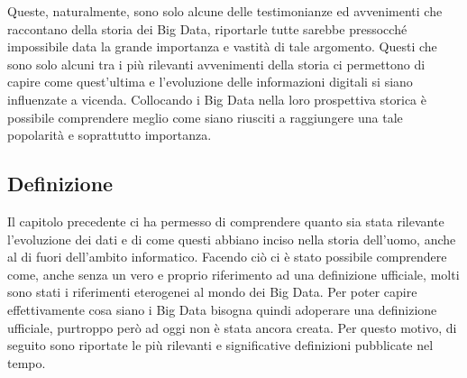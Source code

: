 Queste, naturalmente, sono solo alcune delle testimonianze ed avvenimenti che raccontano della storia dei Big Data, riportarle tutte sarebbe pressocché impossibile data la grande importanza e vastità di tale argomento. Questi che sono solo alcuni tra i più rilevanti avvenimenti della storia ci permettono di capire come quest’ultima e l’evoluzione delle informazioni digitali si siano influenzate a vicenda. Collocando i Big Data nella loro prospettiva storica è possibile comprendere meglio come siano riusciti a raggiungere una tale popolarità e soprattutto importanza.

\subsection{Definizione}

Il capitolo precedente ci ha permesso di comprendere quanto sia stata rilevante l’evoluzione dei dati e di come questi abbiano inciso nella storia dell’uomo, anche al di fuori dell’ambito informatico. Facendo ciò ci è stato possibile comprendere come, anche senza un vero e proprio riferimento ad una definizione ufficiale, molti sono stati i riferimenti eterogenei al mondo dei Big Data. Per poter capire effettivamente cosa siano i Big Data bisogna quindi adoperare una definizione ufficiale, purtroppo però ad oggi non è stata ancora creata. Per questo motivo, di seguito sono riportate le più rilevanti e significative definizioni pubblicate nel tempo.

